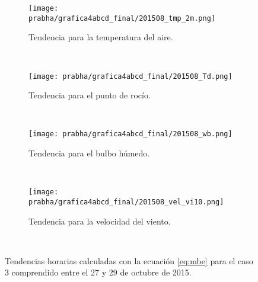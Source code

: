 \begin{figure}[H]
    \centering
    \begin{subfigure}[b]{0.45\textwidth}
        \caption{Tendencia para la temperatura del aire.}
	\texttt{[image: prabha/grafica4abcd\_final/201508\_tmp\_2m.png]}
    \label{subfig:tmp_0_caso3}
	\end{subfigure}
	~
	    \begin{subfigure}[b]{0.45\textwidth}
	        \caption{Tendencia para el punto de rocío.}
	\texttt{[image: prabha/grafica4abcd\_final/201508\_Td.png]}

    \label{subfig:td_caso3}
	\end{subfigure}
	~
	    \begin{subfigure}[b]{0.45\textwidth}
	\caption{Tendencia para el bulbo húmedo.}
	\texttt{[image: prabha/grafica4abcd\_final/201508\_wb.png]}
    \label{subfig:wb_caso3}
	\end{subfigure}
	~
	    \begin{subfigure}[b]{0.45\textwidth}
	\caption{Tendencia para la velocidad del viento.}	
	\texttt{[image: prabha/grafica4abcd\_final/201508\_vel\_vi10.png]}
    
    \label{subfig:vel_caso3}
	\end{subfigure}
	~

\caption{Tendencias horarias calculadas con la ecuación \ref{eq:mbe} para el caso 3 comprendido entre el 27 y 29 de octubre de 2015.}	
\label{subfig:mbe_caso3}	
\end{figure}


